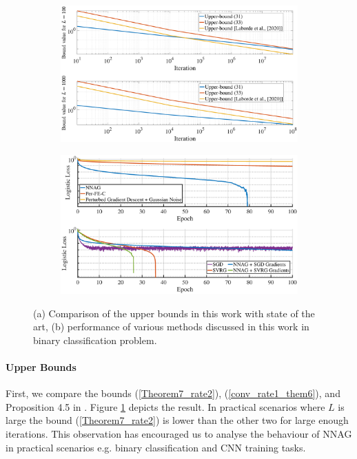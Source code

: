 \documentclass{article}
\theoremstyle{plain}
\theoremstyle{definition}
\theoremstyle{remark}
\begin{document}
\begin{figure}
  \begin{subfigure}{0.51\textwidth}
    \includegraphics[width=\linewidth]{NIPS 2023/Data/upperbounds.eps}
    \caption{} \label{fig1}
  \end{subfigure}%
  \hspace*{\fill}   %
  \begin{subfigure}{0.51\textwidth}
    \includegraphics[width=\linewidth]{NIPS 2023/Data/binary_me_sgd_svrg_corrected_me_sgd_2e5_gaussian_noise_and_no_noise_100_epochs.eps}
    \caption{} \label{fig2}
  \end{subfigure}%
\caption{(a) Comparison of the upper bounds in this work with state of the art, (b) performance of various methods discussed in this work in binary classification problem.} \label{fig:1}
\end{figure}
\paragraph{Upper Bounds}
First, we compare the bounds (\ref{Theorem7_rate2}), (\ref{conv_rate1_them6}), and Proposition 4.5 in \citep{pmlr-v108-laborde20a}. Figure \ref{fig1} depicts the result. In practical scenarios where \(L\) is large \citep{shi2022efficiently} the bound (\ref{Theorem7_rate2}) is lower than the other two for large enough iterations. This observation has encouraged us to analyse the behaviour of NNAG in practical scenarios e.g. binary classification and CNN training tasks.
\end{document}
